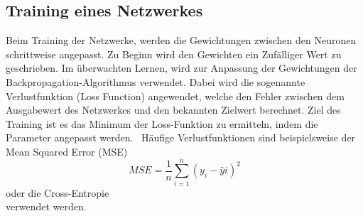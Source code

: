 \subsection{Training eines Netzwerkes}

Beim Training der Netzwerke, werden die Gewichtungen zwischen den Neuronen schrittweise angepasst. 
Zu Beginn wird den Gewichten ein Zufälliger Wert zu geschrieben.
Im überwachten Lernen, wird zur Anpassung der Gewichtungen der Backpropagation-Algorithmus verwendet.
Dabei wird die sogenannte Verlustfunktion (Loss Function) angewendet, welche den Fehler zwischen dem Ausgabewert des Netzwerkes und den bekannten Zielwert berechnet.
Ziel des Training ist es das Minimum der Loss-Funktion zu ermitteln, indem die Parameter angepasst werden.~\cite{datascience}
Häufige Verlustfunktionen sind beispielsweise der Mean Squared Error (MSE)
\begin{equation}
  MSE  =  \frac{1}{n} \sum_{i=1}^{n} (y_i - \hat{y}i)^2
\end{equation}
oder die Cross-Entropie  
\begin{equation}
  
\end{equation}
verwendet werden.